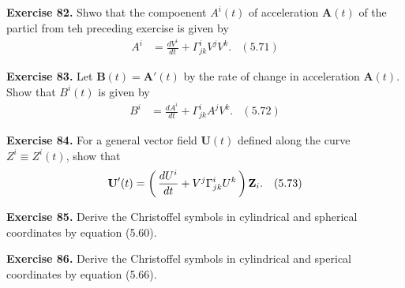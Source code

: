 \documentclass[12pt,a4paper]{report}
\newcommand{\COFF}[3]{\Gamma^{#1}_{{#2}{#3}}}
\newcommand{\VK}[1]{\textbf{#1}}
\begin{document}
\begin{description}
\item \textbf{Exercise 82.}  Shwo that the compoenent $A^i(t)$ of acceleration $\VK{A}(t)$ of the particl from teh preceding exercise is given by 
\begin{align*}
	A^i &= \frac{dV^i}{dt} + \COFF{i}{j}{k}V^jV^k. & (5.71)
\end{align*}

\item \textbf{Exercise 83.}  Let $\VK{B}(t) = \VK{A}'(t)$ by the rate of change in acceleration $\VK{A}(t)$.  Show that $B^i(t)$ is given by 
\begin{align*}
	B^i &= \frac{dA^i}{dt} + \COFF{i}{j}{k}A^jV^k.  & (5.72)
\end{align*}

\item \textbf{Exercise 84.}  For a general vector field $\VK{U}(t)$ defined along the curve $Z^i\equiv Z^i(t)$, show that 
\begin{align*}
	\VK{U}'(t) &= \PAREN{\frac{dU^i}{dt}+V^j\COFF{i}{j}{k}U^k}\VK{Z}_i. & (5.73)
\end{align*}

\item \textbf{Exercise 85.} Derive the Christoffel symbols in cylindrical and spherical coordinates by equation (5.60).

\item \textbf{Exercise 86.} Derive the Christoffel symbols in cylindrical and sperical coordinates by equation (5.66).

\end{description}
\end{document}
